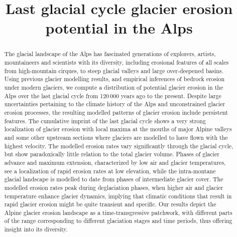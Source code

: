 \documentclass[esurf, manuscript]{copernicus}
\title{Last glacial cycle glacier erosion potential in the Alps}
\affil[1]{Independent scholar, Anafi, Greece}
\affil[2]{Institute of Earth Surface Dynamics, University of Lausanne, Switzerland}
\begin{document}

\maketitle

\begin{abstract}

    The glacial landscape of the Alps has fascinated generations of explorers,
    artists, mountaineers and scientists with its diversity, including
    erosional features of all scales from high-mountain cirques, to steep
    glacial valleys and large over-deepened basins. Using previous glacier
    modelling results, and empirical inferences of bedrock erosion under modern
    glaciers, we compute a distribution of potential glacier erosion in the Alps
    over the last glacial cycle from 120\,000 years ago to the present.
    Despite large uncertainties pertaining to the climate history of the Alps and
    unconstrained glacier erosion processes, the resulting modelled patterns of
    glacier erosion include persistent features. The cumulative imprint of
    the last glacial cycle shows a very strong localization of glacier erosion
    with local maxima at the mouths of major Alpine valleys and some other
    upstream sections where glaciers are modelled to have flown with the
    highest velocity. The modelled erosion rates vary significantly through the
    glacial cycle, but show paradoxically little relation to the total glacier
    volume. Phases of glacier advance and maximum extension, characterized by
    low air and glacier temperatures, see a localization of rapid erosion rates
    at low elevation, while the intra-montane glacial landscape is modelled to
    date from phases of intermediate glacier cover. The modelled erosion rates
    peak during deglaciation phases, when higher air and glacier temperature
    enhance glacier dynamics, implying that climatic conditions that result in
    rapid glacier erosion might be quite transient and specific.
    Our results depict the Alpine glacier erosion landscape as a
    time-transgressive patchwork, with different parts of the
    range corresponding to different glaciation stages and time
    periods, thus offering insight into its diversity.

\end{abstract}


\introduction
\end{document}
